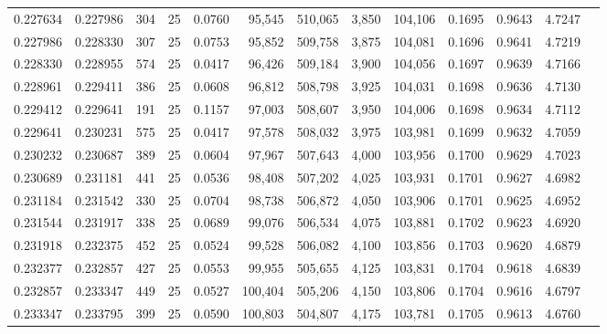 \begin{tabular}{rrrrrrrrrrrrr}
0.227634 & 0.227986 &   304 &  25 &                                     0.0760 &  95,545 & 510,065 &   3,850 & 104,106 & 0.1695 & 0.9643 & 4.7247 \\
0.227986 & 0.228330 &   307 &  25 &                                     0.0753 &  95,852 & 509,758 &   3,875 & 104,081 & 0.1696 & 0.9641 & 4.7219 \\
0.228330 & 0.228955 &   574 &  25 &                                     0.0417 &  96,426 & 509,184 &   3,900 & 104,056 & 0.1697 & 0.9639 & 4.7166 \\
0.228961 & 0.229411 &   386 &  25 &                                     0.0608 &  96,812 & 508,798 &   3,925 & 104,031 & 0.1698 & 0.9636 & 4.7130 \\
0.229412 & 0.229641 &   191 &  25 &                                     0.1157 &  97,003 & 508,607 &   3,950 & 104,006 & 0.1698 & 0.9634 & 4.7112 \\
0.229641 & 0.230231 &   575 &  25 &                                     0.0417 &  97,578 & 508,032 &   3,975 & 103,981 & 0.1699 & 0.9632 & 4.7059 \\
0.230232 & 0.230687 &   389 &  25 &                                     0.0604 &  97,967 & 507,643 &   4,000 & 103,956 & 0.1700 & 0.9629 & 4.7023 \\
0.230689 & 0.231181 &   441 &  25 &                                     0.0536 &  98,408 & 507,202 &   4,025 & 103,931 & 0.1701 & 0.9627 & 4.6982 \\
0.231184 & 0.231542 &   330 &  25 &                                     0.0704 &  98,738 & 506,872 &   4,050 & 103,906 & 0.1701 & 0.9625 & 4.6952 \\
0.231544 & 0.231917 &   338 &  25 &                                     0.0689 &  99,076 & 506,534 &   4,075 & 103,881 & 0.1702 & 0.9623 & 4.6920 \\
0.231918 & 0.232375 &   452 &  25 &                                     0.0524 &  99,528 & 506,082 &   4,100 & 103,856 & 0.1703 & 0.9620 & 4.6879 \\
0.232377 & 0.232857 &   427 &  25 &                                     0.0553 &  99,955 & 505,655 &   4,125 & 103,831 & 0.1704 & 0.9618 & 4.6839 \\
0.232857 & 0.233347 &   449 &  25 &                                     0.0527 & 100,404 & 505,206 &   4,150 & 103,806 & 0.1704 & 0.9616 & 4.6797 \\
0.233347 & 0.233795 &   399 &  25 &                                     0.0590 & 100,803 & 504,807 &   4,175 & 103,781 & 0.1705 & 0.9613 & 4.6760 \\

\end{tabular}
